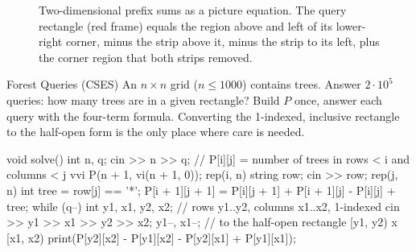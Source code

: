 \begin{figure}[htbp]
\centering
{}
\caption{Two-dimensional prefix sums as a picture equation. The query rectangle (red frame) equals the region above and left
of its lower-right corner, minus the strip above it, minus the strip to its left, plus the corner region that both strips
removed.}
\label{fig:prefix2d}
\end{figure}

\begin{problem}{Forest Queries (CSES)}
An $n \times n$ grid ($n \le 1000$) contains trees. Answer $2\cdot10^5$ queries: how many trees are in a given rectangle?
\solution Build $P$ once, answer each query with the four-term formula. Converting the 1-indexed, inclusive rectangle to the
half-open form is the only place where care is needed.
\end{problem}

\begin{code}
void solve() {
    int n, q;
    cin >> n >> q;
    // P[i][j] = number of trees in rows < i and columns < j
    vvi P(n + 1, vi(n + 1, 0));
    rep(i, n) {
        string row;
        cin >> row;
        rep(j, n) {
            int tree = row[j] == '*';
            P[i + 1][j + 1] = P[i][j + 1] + P[i + 1][j] - P[i][j] + tree;
        }
    }
    while (q--) {
        int y1, x1, y2, x2;  // rows y1..y2, columns x1..x2, 1-indexed
        cin >> y1 >> x1 >> y2 >> x2;
        y1--, x1--;  // to the half-open rectangle [y1, y2) x [x1, x2)
        print(P[y2][x2] - P[y1][x2] - P[y2][x1] + P[y1][x1]);
    }
}
\end{code}


